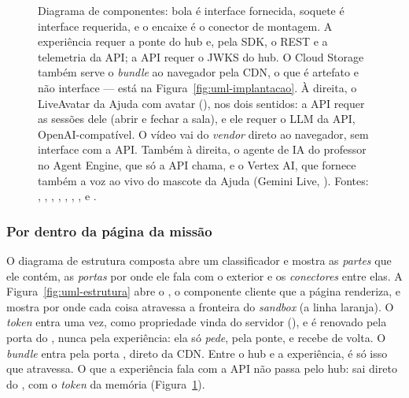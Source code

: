 \begin{figure}[H]
{\begin{tikzpicture}[x=1cm, y=1cm]
\end{tikzpicture}}
\caption[Componentes e interfaces]{Diagrama de componentes: bola é interface
  fornecida, soquete é interface requerida, e o encaixe é o conector de montagem.
  A experiência requer a ponte do hub e, pela SDK, o REST e a telemetria da API;
  a API requer o JWKS do hub. O Cloud Storage também serve o \emph{bundle} ao
  navegador pela CDN, o que é artefato e não interface --- está na
  Figura~\ref{fig:uml-implantacao}. À direita, o LiveAvatar da Ajuda com avatar
  (), nos dois sentidos: a API requer as sessões dele (abrir e
  fechar a sala), e ele requer o LLM da API, OpenAI-compatível. O vídeo vai do
  \emph{vendor} direto ao navegador, sem interface com a API. Também à direita,
  o agente de IA do professor no Agent Engine, que só a API chama, e o Vertex
  AI, que fornece também a voz ao vivo do mascote da Ajuda (Gemini Live,
  ). Fontes: ,
  , ,
  ,
  ,
  ,
  ,
   e
  .}
\label{fig:uml-componentes}
\end{figure}

\subsubsection{Por dentro da página da missão}

O diagrama de estrutura composta abre um classificador e mostra as
\emph{partes} que ele contém, as \emph{portas} por onde ele fala com o exterior e
os \emph{conectores} entre elas. A Figura~\ref{fig:uml-estrutura} abre o
, o componente cliente que a página  renderiza, e
mostra por onde cada coisa atravessa a fronteira do \emph{sandbox} (a linha
laranja). O \emph{token} entra uma vez, como propriedade vinda do servidor
(), e é renovado pela porta  do , nunca
pela experiência: ela só \emph{pede}, pela ponte, e recebe  de
volta. O \emph{bundle} entra pela porta , direto da CDN. Entre o hub e
a experiência, é só isso que atravessa. O que a experiência fala com a API não
passa pelo hub: sai direto do , com o \emph{token} da memória
(Figura~\ref{fig:uml-componentes}).

